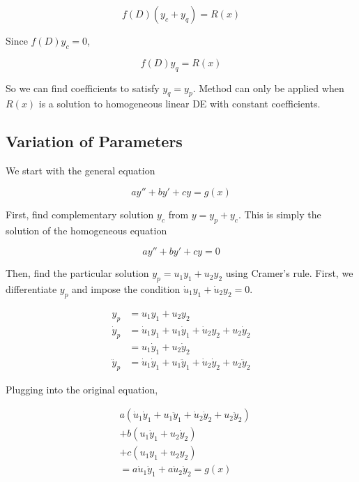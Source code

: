 \begin{equation}
    f(D)(y_c+y_q)=R(x)
\end{equation}

Since $f(D)y_c=0$,

\begin{equation}
    f(D)y_q=R(x)
\end{equation}

So we can find coefficients to satisfy $y_q=y_p$.
Method can only be applied when $R(x)$ is a solution to homogeneous linear DE with constant coefficients.

\subsection{Variation of Parameters}

We start with the general equation

\begin{equation}
    ay''+by'+cy=g(x)
\end{equation}

First, find complementary solution $y_c$ from $y=y_p+y_c$. This is simply the solution of the homogeneous equation

\begin{equation}
    ay''+by'+cy=0
\end{equation}

Then, find the particular solution $y_p=u_1y_1+u_2y_2$ using Cramer's rule.
First, we differentiate $y_p$ and impose the condition $\dot u_1y_1+\dot u_2y_2=0$.

\begin{align}
    y_p&=u_1y_1+u_2y_2\\
    \dot y_p&= \dot u_1y_1+u_1\dot y_1+\dot u_2y_2+u_2\dot y_2\\
    &=u_1\dot y_1+u_2\dot y_2\\
    \ddot y_p&=\dot u_1\dot y_1+u_1\ddot y_1+\dot u_2\dot y_2+u_2\ddot y_2
\end{align}

Plugging into the original equation,

\begin{align*}
    &a(\dot u_1\dot y_1+u_1\ddot y_1+\dot u_2\dot y_2+u_2\ddot y_2)\\
    &+b(u_1\dot y_1+u_2\dot y_2)\\
    &+c(u_1y_1+u_2y_2)\\
    &=a\dot u_1\dot y_1 + a\dot u_2\dot y_2=g(x)
\end{align*}

